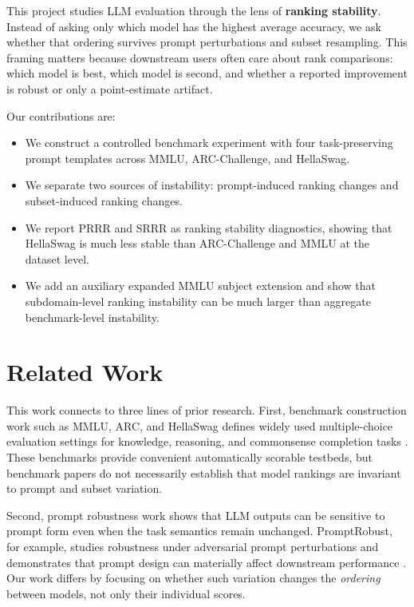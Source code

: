 \documentclass[11pt]{article}
\begin{document}
This project studies LLM evaluation through the lens of \textbf{ranking stability}. Instead of asking only which model has the highest average accuracy, we ask whether that ordering survives prompt perturbations and subset resampling. This framing matters because downstream users often care about rank comparisons: which model is best, which model is second, and whether a reported improvement is robust or only a point-estimate artifact.

Our contributions are:
\begin{itemize}[leftmargin=*]
    \item We construct a controlled benchmark experiment with four task-preserving prompt templates across MMLU, ARC-Challenge, and HellaSwag.
    \item We separate two sources of instability: prompt-induced ranking changes and subset-induced ranking changes.
    \item We report PRRR and SRRR as ranking stability diagnostics, showing that HellaSwag is much less stable than ARC-Challenge and MMLU at the dataset level.
    \item We add an auxiliary expanded MMLU subject extension and show that subdomain-level ranking instability can be much larger than aggregate benchmark-level instability.
\end{itemize}

\section{Related Work}

This work connects to three lines of prior research. First, benchmark construction work such as MMLU, ARC, and HellaSwag defines widely used multiple-choice evaluation settings for knowledge, reasoning, and commonsense completion tasks \cite{hendrycks2020mmlu, clark2018arc, zellers2019hellaswag}. These benchmarks provide convenient automatically scorable testbeds, but benchmark papers do not necessarily establish that model rankings are invariant to prompt and subset variation.

Second, prompt robustness work shows that LLM outputs can be sensitive to prompt form even when the task semantics remain unchanged. PromptRobust, for example, studies robustness under adversarial prompt perturbations and demonstrates that prompt design can materially affect downstream performance \cite{zhu2023promptrobust}. Our work differs by focusing on whether such variation changes the \emph{ordering} between models, not only their individual scores.
\end{document}
